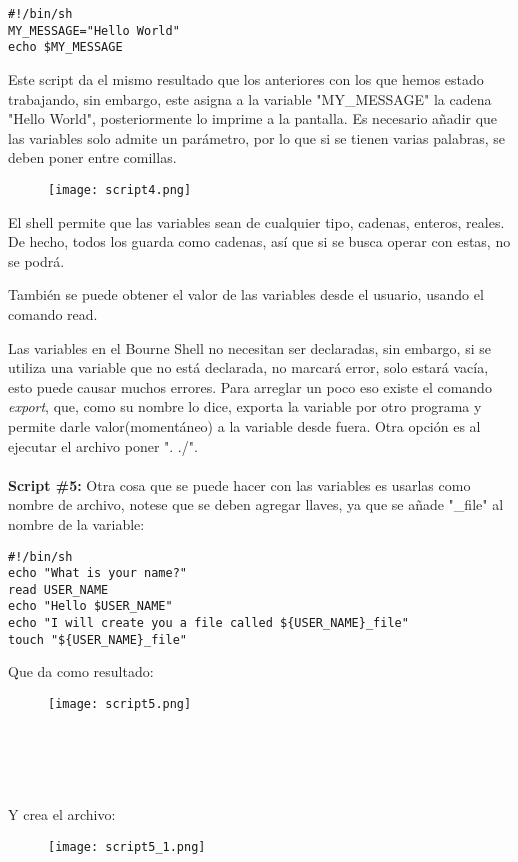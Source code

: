 \documentclass[a4paper]{article}
\begin{document}
\begin{verbatim}
#!/bin/sh
MY_MESSAGE="Hello World"
echo $MY_MESSAGE
\end{verbatim}

Este script da el mismo resultado que los anteriores con los que hemos estado trabajando, sin embargo, este asigna a la variable "MY\_MESSAGE" la cadena "Hello World", posteriormente lo imprime a la pantalla. Es necesario añadir que las variables solo admite un parámetro, por lo que si se tienen varias palabras, se deben poner entre comillas.
\begin{figure}[h!]
  \texttt{[image: script4.png]}
  \centering
  \label{fig:15}
\end{figure}

El shell permite que las variables sean de cualquier tipo, cadenas, enteros, reales. De hecho, todos los guarda como cadenas, así que si se busca operar con estas, no se podrá. 

También se puede obtener el valor de las variables desde el usuario, usando el comando read.

Las variables en el Bourne Shell no necesitan ser declaradas, sin embargo, si se utiliza una variable que no está declarada, no marcará error, solo estará vacía, esto puede causar muchos errores. Para arreglar un poco eso existe el comando \textit{export}, que, como su nombre lo dice, exporta la variable por otro programa y permite darle valor(momentáneo) a la variable desde fuera. Otra opción es al ejecutar el archivo poner ". ./".\\
\\
\textbf{Script \#5:} Otra cosa que se puede hacer con las variables es usarlas como nombre de archivo, notese que se deben agregar llaves, ya que se añade "\_file" al nombre de la variable: 
\begin{verbatim}
#!/bin/sh
echo "What is your name?"
read USER_NAME
echo "Hello $USER_NAME"
echo "I will create you a file called ${USER_NAME}_file"
touch "${USER_NAME}_file"
\end{verbatim}

Que da como resultado: 
\begin{figure}[h!]
  \texttt{[image: script5.png]}
  \centering
  \label{fig:16}\\
\end{figure}
\\
\\
\\
\\
Y crea el archivo:
\begin{figure}[h!]
  \texttt{[image: script5\_1.png]}
  \centering
  \label{fig:17}
\end{figure}
\end{document}
